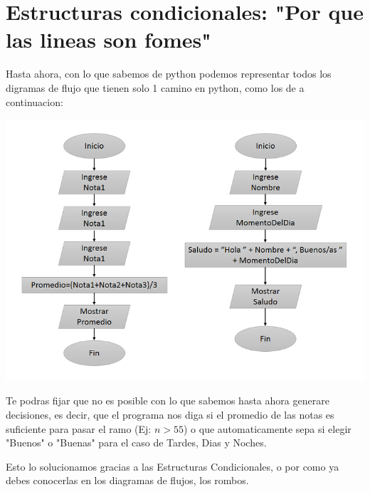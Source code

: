 \section{Estructuras condicionales: "Por que las lineas son fomes" }

Hasta ahora, con lo que sabemos de python podemos representar todos los digramas de flujo que tienen solo 1 camino en python, como los de a continuacion:

  \begin{center}
    \includegraphics[scale=0.6]{Imagenes/DiagramasFlujo}
  \end{center}
  
Te podras fijar que no es posible con lo que sabemos hasta ahora generare decisiones, es decir, que el programa nos diga si el promedio de las notas es suficiente para pasar el ramo (Ej: $n >55$) o que automaticamente sepa si elegir "Buenos" o "Buenas" para el caso de Tardes, Dias y Noches.

Esto lo solucionamos gracias a las Estructuras Condicionales, o por como ya debes conocerlas en los diagramas de flujos, los rombos.

